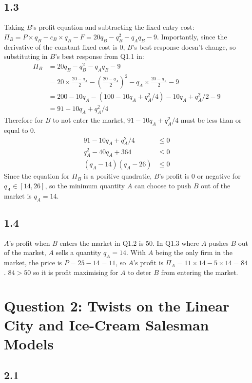 \documentclass{article}
\begin{document}
\subsection*{1.3}
Taking $B$'s profit equation and subtracting the fixed entry cost:
$\Pi_{B} = P \times q_{B} - c_{B} \times q_{B} - F = 20q_{B} - q_{B}^{2} - q_{A}q_{B} - 9.$
Importantly, since the derivative of the constant fixed cost is 0, $B$'s best response doesn't change, so substituting in $B$'s best response from Q1.1 in:
\begin{align*}
    \Pi_{B} &= 20q_{B} - q_{B}^{2} - q_{A}q_{B} - 9\\
    &= 20 \times \frac{20 - q_{A}}{2} - \left( \frac{20 - q_{A}}{2} \right)^{2} - q_{A} \times \frac{20 - q_{A}}{2} - 9\\
    &= 200 - 10q_{A} - (100 - 10q_{A} + q_{A}^{2}/4) - 10q_{A} + q_{A}^{2}/2 - 9\\
    &= 91 - 10q_{A} + q_{A}^{2}/4
\end{align*}
Therefore for $B$ to not enter the market, $91 - 10q_{A} + q_{A}^{2}/4$ must be less than or equal to 0.
\begin{align*}
    91 - 10q_{A} + q_{A}^{2}/4 &\leq 0\\
    q_{A}^{2} - 40q_{A} + 364 &\leq 0\\
    (q_{A} - 14)(q_{A} - 26) &\leq 0
\end{align*}
Since the equation for $\Pi_{B}$ is a positive quadratic, $B$'s profit is 0 or negative for $q_{A} \in [14, 26]$, so the minimum quantity $A$ can choose to push $B$ out of the market is $q_{A} = 14$.

\subsection*{1.4}
$A$'s profit when $B$ enters the market in Q1.2 is 50. In Q1.3 where $A$ pushes $B$ out of the market, $A$ sells a quantity $q_{A} = 14$. With $A$ being the only firm in the market, the price is $P = 25 - 14 = 11$, so $A$'s profit is $\Pi_{A} = 11 \times 14 - 5 \times 14 = 84$. $84 > 50$ so it is profit maximising for $A$ to deter $B$ from entering the market.

\section*{Question 2: Twists on the Linear City and Ice-Cream Salesman Models}
\subsection*{2.1}
\end{document}
